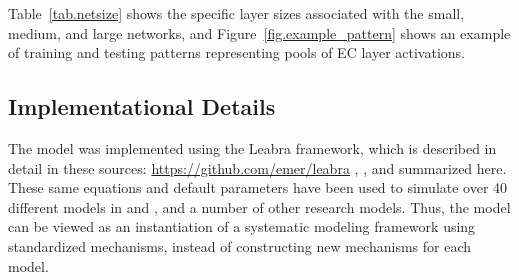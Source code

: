 \documentclass[11pt,twoside]{article}
\newif\myifpdf
\begin{document}
Table~\ref{tab.netsize} shows the specific layer sizes associated with the small, medium, and large networks, and Figure~\ref{fig.example_pattern} shows an example of training and testing patterns representing pools of EC layer activations.



\subsection{Implementational Details}

The model was implemented using the Leabra framework, which is described in detail in these sources: \url{https://github.com/emer/leabra} \citet{OReillyMunakataFrankEtAl12}, \citet{OReillyMunakata00}, and summarized here.  These same equations and default parameters have been used to simulate over 40 different models in \citet{OReillyMunakataFrankEtAl12} and \citet{OReillyMunakata00}, and a number of other research models.  Thus, the model can be viewed as an instantiation of a systematic modeling framework using standardized mechanisms, instead of constructing new mechanisms for each model.
\end{document}
